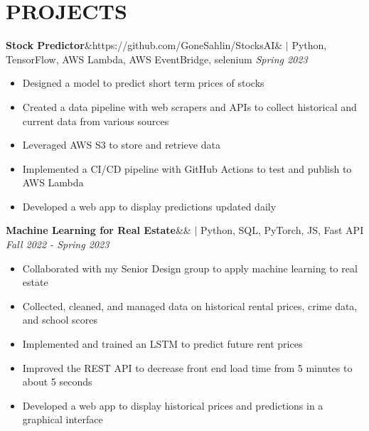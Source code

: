 \documentclass[11pt, a4paper, roman]{moderncv}
\newcommand{\project}[5]{
	\textbf{#1}\ifx&#2&{}
	\else
    		\href{#2}{\:\small\faGithub\:}\fi$|$ #3
	\hfill\textit{#4}
	#5
	\vspace{2mm}
}
\begin{document}
\vspace*{-2mm}
\section{PROJECTS}

{\project{Stock Predictor}{https://github.com/GoneSahlin/StocksAI}{Python, TensorFlow, AWS Lambda, AWS EventBridge, selenium}{Spring 2023}
	{\begin{itemize}
		\item Designed a model to predict short term prices of stocks
		\item Created a data pipeline with web scrapers and APIs to collect historical and current data from various sources
		\item Leveraged AWS S3 to store and retrieve data
		\item Implemented a CI/CD pipeline with GitHub Actions to test and publish to AWS Lambda
		\item Developed a web app to display predictions updated daily
	\end{itemize}}
}

{\project{Machine Learning for Real Estate}{}{Python, SQL, PyTorch, JS, Fast API}{Fall 2022 - Spring 2023}
	{\begin{itemize}
		\item Collaborated with my Senior Design group to apply machine learning to real estate
		\item Collected, cleaned, and managed data on historical rental prices, crime data, and school scores
		\item Implemented and trained an LSTM to predict future rent prices
		\item Improved the REST API to decrease front end load time from 5 minutes to about 5 seconds
		\item Developed a web app to display historical prices and predictions in a graphical interface
	\end{itemize}}
}
\end{document}
